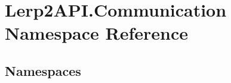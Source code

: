 \hypertarget{namespace_lerp2_a_p_i_1_1_communication}{}\section{Lerp2\+A\+P\+I.\+Communication Namespace Reference}
\label{namespace_lerp2_a_p_i_1_1_communication}
\subsection*{Namespaces}
\begin{DoxyCompactItemize}
\end{DoxyCompactItemize}
